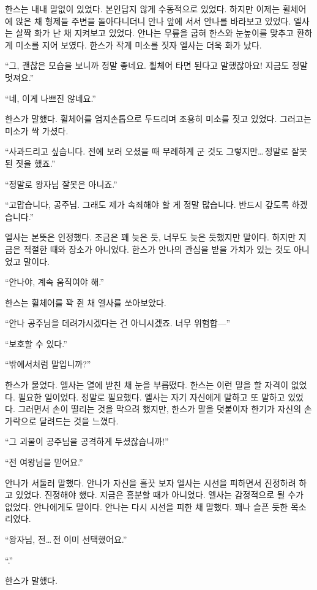 한스는 내내 말없이 있었다. 본인답지 않게 수동적으로 있었다. 하지만 이제는 휠체어에 앉은 채 형제들 주변을 돌아다니더니 안나 앞에 서서 안나를 바라보고 있었다. 엘사는 살짝 화가 난 채 지켜보고 있었다. 안나는 무릎을 굽혀 한스와 눈높이를 맞추고 환하게 미소를 지어 보였다. 한스가 작게 미소를 짓자 엘사는 더욱 화가 났다.

``그, 괜찮은 모습을 보니까 정말 좋네요. 휠체어 타면 된다고 말했잖아요! 지금도 정말 멋져요.''

``네, 이게 나쁘진 않네요.''

한스가 말했다. 휠체어를 엄지손톱으로 두드리며 조용히 미소를 짓고 있었다. 그러고는 미소가 싹 가셨다.

``사과드리고 싶습니다. 전에 보러 오셨을 때 무례하게 군 것도 그렇지만\ldots\,정말로 잘못된 짓을 했죠.''

``정말로 왕자님 잘못은 아니죠.''

``고맙습니다, 공주님. 그래도 제가 속죄해야 할 게 정말 많습니다. 반드시 갚도록 하겠습니다.''

엘사는 본뜻은 인정했다. 조금은 꽤 늦은 듯, 너무도 늦은 듯했지만 말이다. 하지만 지금은 적절한 때와 장소가 아니었다. 한스가 안나의 관심을 받을 가치가 있는 것도 아니었고 말이다.

``안나야, 계속 움직여야 해.''

한스는 휠체어를 꽉 쥔 채 엘사를 쏘아보았다.

``안나 공주님을 데려가시겠다는 건 아니시겠죠. 너무 위험합—''

``보호할 수 있다.''

``밖에서처럼 말입니까?''

한스가 물었다. 엘사는 열에 받친 채 눈을 부릅떴다. 한스는 이런 말을 할 자격이 없었다. 필요한 일이었다. 정말로 필요했다. 엘사는 자기 자신에게 말하고 또 말하고 있었다. 그러면서 손이 떨리는 것을 막으려 했지만, 한스가 말을 덧붙이자 한기가 자신의 손가락으로 달려드는 것을 느꼈다.

``그 괴물이 공주님을 공격하게 두셨잖습니까!''

``전 여왕님을 믿어요.''

안나가 서둘러 말했다. 안나가 자신을 흘끗 보자 엘사는 시선을 피하면서 진정하려 하고 있었다. 진정해야 했다. 지금은 흥분할 때가 아니었다. 엘사는 감정적으로 될 수가 없었다. 안나에게도 말이다. 안나는 다시 시선을 피한 채 말했다. 꽤나 슬픈 듯한 목소리였다.

``왕자님, 전\ldots\,전 이미 선택했어요.''

``.''

한스가 말했다.

